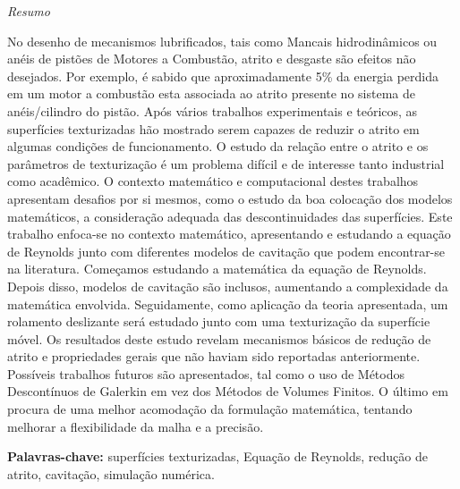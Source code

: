\documentclass[11pt,twoside,a4paper]{Thesis} %
\begin{document}

\thispagestyle{empty}\null\vfil
\begin{center}
\setlength{\parskip}{0pt}
{\huge{\textit{Resumo}} \par}
\end{center}

No desenho de mecanismos lubrificados, tais como Mancais hidrodinâmicos ou anéis de pistões de Motores a Combustão, atrito e desgaste são efeitos não desejados. Por exemplo, é sabido que aproximadamente 5\% da energia perdida em um motor a combustão esta associada ao atrito presente no sistema de anéis/cilindro do pistão. Após vários trabalhos experimentais e teóricos, as superfícies texturizadas hão mostrado serem capazes de reduzir o atrito em algumas condições de funcionamento. O estudo da relação entre o atrito e os parâmetros de texturização é um problema difícil e de interesse tanto industrial como acadêmico. %
O contexto matemático e computacional destes trabalhos apresentam desafios por si mesmos, como o estudo da boa colocação dos modelos matemáticos, a consideração adequada das descontinuidades das superfícies. %
Este trabalho enfoca-se no contexto matemático, apresentando e estudando a equação de Reynolds junto com diferentes modelos de cavitação que podem encontrar-se na literatura. Começamos estudando a matemática da equação de Reynolds. Depois disso, modelos de cavitação são inclusos, aumentando a complexidade da matemática envolvida. Seguidamente, como aplicação da teoria apresentada, um rolamento deslizante será estudado junto com uma texturização da superfície móvel. Os resultados deste estudo revelam mecanismos básicos de redução de atrito e propriedades gerais que não haviam sido reportadas anteriormente. %
Possíveis trabalhos futuros são apresentados, tal como o uso de Métodos Descontínuos de Galerkin em vez dos Métodos de Volumes Finitos. O último em procura de uma melhor acomodação da formulação matemática, tentando melhorar a flexibilidade da malha e a precisão.
\bigskip

\textbf{Palavras-chave:} superfícies texturizadas, Equação de Reynolds, redução de atrito, cavitação, simulação numérica.
\clearpage
\end{document}
